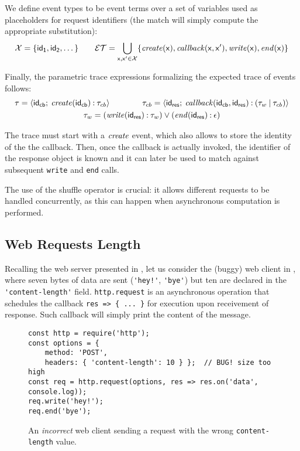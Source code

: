 We define event types to be event terms over a set of variables \vars used as placeholders for request identifiers (the match will simply compute the appropriate substitution):
\[ \mathcal{X} = \{ \mathsf{id_1}, \mathsf{id_2}, \dotsc \}\qquad
\mathcal{ET} = \bigcup_{\mathsf{x},\mathsf{x}' \in \mathcal{X}} \{\mathit{create}(\mathsf{x}), \mathit{callback}(\mathsf{x}, \mathsf{x}'), \mathit{write}(\mathsf{x}), \mathit{end}(\mathsf{x}) \} \]

Finally, the parametric trace expressions formalizing the expected trace of events follows:
\begin{gather*}
	\tau = {\langle}\mathsf{\mathsf{id_{cb}}{}};\:{\mathit{create}(\mathsf{id_{cb}}{}) \mathbin{:} \tau_{cb}}{\rangle} \qquad\qquad
	\tau_{cb} = {\langle}\mathsf{\mathsf{id_{res}}{}};\:{\mathit{callback}(\mathsf{id_{cb}}, \mathsf{id_{res}}) \mathbin{:} (\tau_w \mathbin{|} \tau_{cb})}{\rangle}\\
	\tau_w = (\mathit{write}(\mathsf{id_{res}}) \mathbin{:} \tau_w) \mathbin{\vee} (\mathit{end}(\mathsf{id_{res}}) \mathbin{:} \epsilon)
\end{gather*}

The trace must start with a \(\mathit{create}\) event, which also allows to store the identity of the the callback.
Then, once the callback is actually invoked, the identifier of the response object is known and it can later be used to match against subsequent \lstinline|write| and \lstinline|end| calls.

The use of the shuffle operator is crucial: it allows different requests to be handled concurrently, as this can happen when asynchronous computation is performed.

\subsection{Web Requests Length}
\label{sec:web-req}
Recalling the web server presented in , let us consider the (buggy) web client in , where seven bytes of data are sent (\lstinline{'hey!'}, \lstinline{'bye'}) but ten are declared in the \lstinline{'content-length'} field.
\lstinline{http.request} is an asynchronous operation that schedules the callback \lstinline!res => { ... }! for execution upon receivement of response.
Such callback will simply print the content of the message.

\begin{figure}[h]
\begin{lstlisting}
const http = require('http');
const options = {
	method: 'POST',
	headers: { 'content-length': 10 } };  // BUG! size too high
const req = http.request(options, res => res.on('data', console.log));
req.write('hey!');
req.end('bye');
\end{lstlisting}
\caption{An \emph{incorrect} web client sending a request with the wrong \texttt{content-length} value.}
\label{lst:client}
\end{figure}

